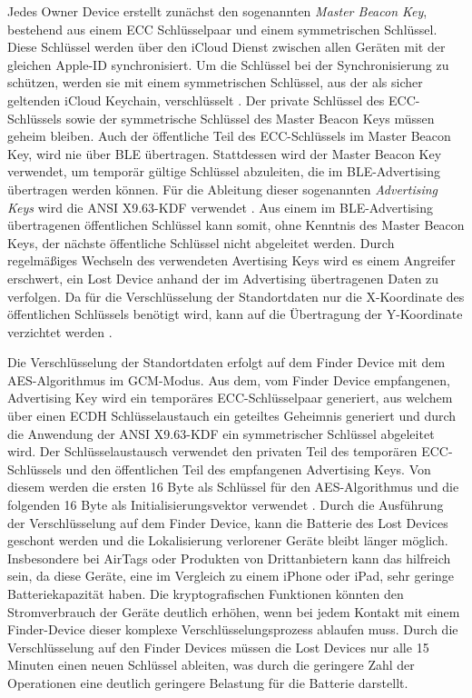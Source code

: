 Jedes Owner Device erstellt zunächst den sogenannten \textit{Master Beacon Key}, bestehend aus einem \ac{ECC} Schlüsselpaar und einem symmetrischen Schlüssel.
Diese Schlüssel werden über den iCloud Dienst zwischen allen Geräten mit der gleichen Apple-ID synchronisiert.
Um die Schlüssel bei der Synchronisierung zu schützen, werden sie mit einem symmetrischen Schlüssel, aus der als sicher geltenden iCloud Keychain, verschlüsselt \cite{Heinrich_FindMy,Afonin_iCloudKeychain}.
Der private Schlüssel des \ac{ECC}-Schlüssels sowie der symmetrische Schlüssel des Master Beacon Keys müssen geheim bleiben.
Auch der öffentliche Teil des \ac{ECC}-Schlüssels im Master Beacon Key, wird nie über \ac{BLE} übertragen.
Stattdessen wird der Master Beacon Key verwendet, um temporär gültige Schlüssel abzuleiten, die im \ac{BLE}-Advertising übertragen werden können.
Für die Ableitung dieser sogenannten \textit{Advertising Keys} wird die ANSI X9.63-\ac{KDF} verwendet \cite{Apple_FindMySpec}.
Aus einem im \ac{BLE}-Advertising übertragenen öffentlichen Schlüssel kann somit, ohne Kenntnis des Master Beacon Keys, der nächste öffentliche Schlüssel nicht abgeleitet werden.
Durch regelmäßiges Wechseln des verwendeten Avertising Keys wird es einem Angreifer erschwert, ein Lost Device anhand der im Advertising übertragenen Daten zu verfolgen.
Da für die Verschlüsselung der Standortdaten nur die X-Koordinate des öffentlichen Schlüssels benötigt wird, kann auf die Übertragung der Y-Koordinate verzichtet werden \cite{Heinrich_FindMy}.

Die Verschlüsselung der Standortdaten erfolgt auf dem Finder Device mit dem \ac{AES}-Algorithmus im \ac{GCM}-Modus.
Aus dem, vom Finder Device empfangenen, Advertising Key wird ein temporäres \ac{ECC}-Schlüsselpaar generiert, aus welchem über einen \ac{ECDH} Schlüsselaustauch ein geteiltes Geheimnis generiert und durch die Anwendung der ANSI X9.63-\ac{KDF} ein symmetrischer Schlüssel abgeleitet wird.
Der Schlüsselaustausch verwendet den privaten Teil des temporären \ac{ECC}-Schlüssels und den öffentlichen Teil des empfangenen Advertising Keys.
Von diesem werden die ersten 16 Byte als Schlüssel für den \ac{AES}-Algorithmus und die folgenden 16 Byte als Initialisierungsvektor verwendet \cite{Heinrich_FindMy}.
Durch die Ausführung der Verschlüsselung auf dem Finder Device, kann die Batterie des Lost Devices geschont werden und die Lokalisierung verlorener Geräte bleibt länger möglich.
Insbesondere bei AirTags oder Produkten von Drittanbietern kann das hilfreich sein, da diese Geräte, eine im Vergleich zu einem iPhone oder iPad, sehr geringe Batteriekapazität haben.
Die kryptografischen Funktionen könnten den Stromverbrauch der Geräte deutlich erhöhen, wenn bei jedem Kontakt mit einem Finder-Device dieser komplexe Verschlüsselungsprozess ablaufen muss.
Durch die Verschlüsselung auf den Finder Devices müssen die Lost Devices nur alle 15 Minuten einen neuen Schlüssel ableiten, was durch die geringere Zahl der Operationen eine deutlich geringere Belastung für die Batterie darstellt.


